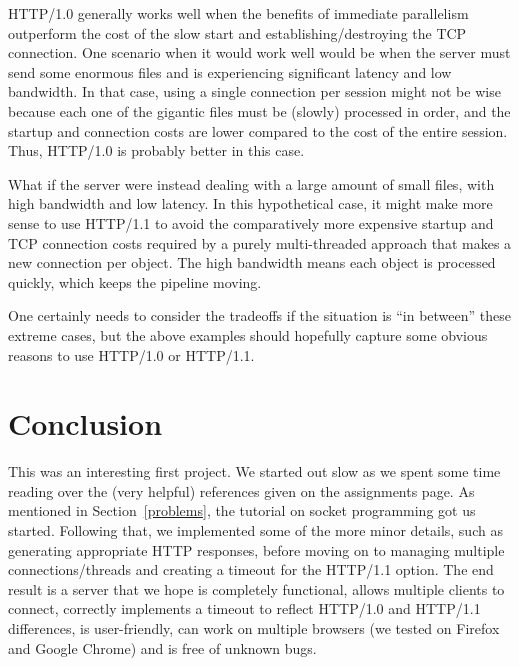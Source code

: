 \documentclass[letterpaper,11pt,twocolumn]{article}
\begin{document}
HTTP/1.0 generally works well when the benefits of immediate parallelism outperform the cost of the slow start and establishing/destroying the TCP
connection. One scenario when it would work well would be when the server must send some enormous files and is experiencing significant latency and
low bandwidth. In that case, using a single connection per session might not be wise because each one of the gigantic files must be (slowly) processed
in order, and the startup and connection costs are lower compared to the cost of the entire session. Thus, HTTP/1.0 is probably better in this case.

What if the server were instead dealing with a large amount of small files, with high bandwidth and low latency. In this hypothetical case, it might
make more sense to use HTTP/1.1 to avoid the comparatively more expensive startup and TCP connection costs required by a purely multi-threaded
approach that makes a new connection per object. The high bandwidth means each object is processed quickly, which keeps the pipeline moving.

One certainly needs to consider the tradeoffs if the situation is ``in between'' these extreme cases, but the above examples should hopefully capture
some obvious reasons to use HTTP/1.0 or HTTP/1.1.

\section{Conclusion}\label{conclusion}
This was an interesting first project. We started out slow as we spent some time reading over the (very helpful) references given on the assignments
page. As mentioned in Section~\ref{problems}, the tutorial on socket programming got us started. Following that, we implemented some of the more minor
details, such as generating appropriate HTTP responses, before moving on to managing multiple connections/threads and creating a timeout for the
HTTP/1.1 option. The end result is a server that we hope is completely functional, allows multiple clients to connect, correctly implements a timeout
to reflect HTTP/1.0 and HTTP/1.1 differences, is user-friendly, can work on multiple browsers (we tested on Firefox and Google Chrome) and is free of
unknown bugs.

%
%

\end{document}
